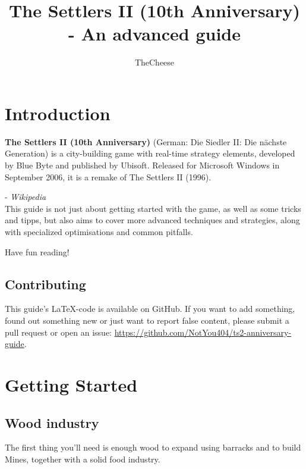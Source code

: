\documentclass[11pt]{article}
\title{The Settlers II (10th Anniversary) - An advanced guide}
\author{TheCheese}
\date{}
\begin{document}
\maketitle

\vspace{2cm}

\begingroup
  \hypersetup{hidelinks}
  \tableofcontents
\endgroup


\section{Introduction}

\begin{displayquote}
\textbf{The Settlers II (10th Anniversary)} (German: Die Siedler II: Die nächste Generation) is a city-building game with real-time strategy elements, developed by Blue Byte and published by Ubisoft. Released for Microsoft Windows in September 2006, it is a remake of The Settlers II (1996).
\end{displayquote}
\hspace{2cm}- \textit{Wikipedia}\\

This guide is not just about getting started with the game, as well as some tricks and tipps, but also aims to cover more advanced techniques and strategies, along with specialized optimisations and common pitfalls.

Have fun reading!

\subsection{Contributing}

This guide's \LaTeX-code is available on GitHub. If you want to add something, found out something new or just want to report false content, please submit a pull request or open an issue: \url{https://github.com/NotYou404/ts2-anniversary-guide}.

\section{Getting Started}

\subsection{Wood industry}
\label{sec:woodindustry}

The first thing you'll need is enough wood to expand using barracks and to build Mines, together with a solid food industry.
\end{document}
